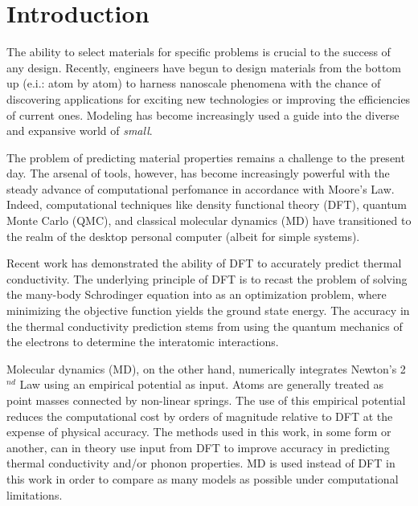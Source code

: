 \chapter{Introduction}

The ability to select materials for specific problems is crucial to the success of any design. Recently, engineers have begun to design materials from the bottom up (e.i.: atom by atom) to harness nanoscale phenomena with the chance of discovering applications for exciting new technologies or improving the efficiencies of current ones. Modeling has become increasingly used a guide into the diverse and expansive world of \textit{small}.

The problem of predicting material properties remains a challenge to the present day. The arsenal of tools, however, has become increasingly powerful with the steady advance of computational perfomance in accordance with Moore's Law. Indeed, computational techniques like density functional theory (DFT), quantum Monte Carlo (QMC), and classical molecular dynamics (MD) have transitioned to the realm of the desktop personal computer (albeit for simple systems).

Recent work has demonstrated the ability of DFT \cite{broido1,PhysRevB.84.085204} to accurately predict thermal conductivity. The underlying principle of DFT is to recast the problem of solving the many-body Schrodinger equation into as an optimization problem, where minimizing the objective function yields the ground state energy. The accuracy in the thermal conductivity prediction stems from using the quantum mechanics of the electrons to determine the interatomic interactions.

Molecular dynamics (MD), on the other hand, numerically integrates Newton's 2$^{nd}$ Law using an empirical potential as input. Atoms are generally treated as point masses connected by non-linear springs. The use of this empirical potential reduces the computational cost by orders of magnitude relative to DFT at the expense of physical accuracy. The methods used in this work, in some form or another, can in theory use input from DFT to improve accuracy in predicting thermal conductivity and/or phonon properties. MD is used instead of DFT in this work in order to compare as many models as possible under computational limitations.

